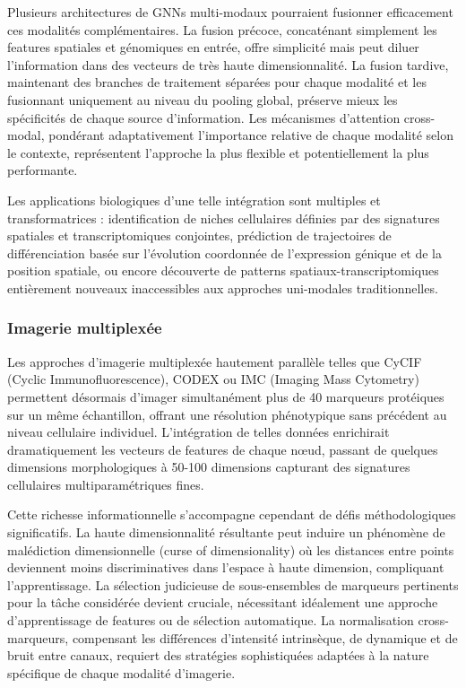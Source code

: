Plusieurs architectures de GNNs multi-modaux pourraient fusionner efficacement ces modalités complémentaires. La fusion précoce, concaténant simplement les features spatiales et génomiques en entrée, offre simplicité mais peut diluer l'information dans des vecteurs de très haute dimensionnalité. La fusion tardive, maintenant des branches de traitement séparées pour chaque modalité et les fusionnant uniquement au niveau du pooling global, préserve mieux les spécificités de chaque source d'information. Les mécanismes d'attention cross-modal, pondérant adaptativement l'importance relative de chaque modalité selon le contexte, représentent l'approche la plus flexible et potentiellement la plus performante.

Les applications biologiques d'une telle intégration sont multiples et transformatrices : identification de niches cellulaires définies par des signatures spatiales et transcriptomiques conjointes, prédiction de trajectoires de différenciation basée sur l'évolution coordonnée de l'expression génique et de la position spatiale, ou encore découverte de patterns spatiaux-transcriptomiques entièrement nouveaux inaccessibles aux approches uni-modales traditionnelles.

\subsubsection{Imagerie multiplexée}

Les approches d'imagerie multiplexée hautement parallèle telles que CyCIF (Cyclic Immunofluorescence), CODEX ou IMC (Imaging Mass Cytometry) permettent désormais d'imager simultanément plus de 40 marqueurs protéiques sur un même échantillon, offrant une résolution phénotypique sans précédent au niveau cellulaire individuel. L'intégration de telles données enrichirait dramatiquement les vecteurs de features de chaque nœud, passant de quelques dimensions morphologiques à 50-100 dimensions capturant des signatures cellulaires multiparamétriques fines.

Cette richesse informationnelle s'accompagne cependant de défis méthodologiques significatifs. La haute dimensionnalité résultante peut induire un phénomène de malédiction dimensionnelle (curse of dimensionality) où les distances entre points deviennent moins discriminatives dans l'espace à haute dimension, compliquant l'apprentissage. La sélection judicieuse de sous-ensembles de marqueurs pertinents pour la tâche considérée devient cruciale, nécessitant idéalement une approche d'apprentissage de features ou de sélection automatique. La normalisation cross-marqueurs, compensant les différences d'intensité intrinsèque, de dynamique et de bruit entre canaux, requiert des stratégies sophistiquées adaptées à la nature spécifique de chaque modalité d'imagerie.

